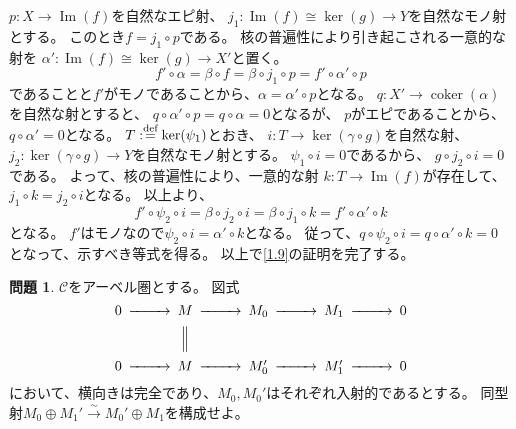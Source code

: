 \documentclass[uplatex,dvipdfmx]{jsarticle}
\makeatletter
\theoremstyle{definition}
\newtheorem{prob}[prob]{問題}
\renewenvironment{proof}[1][\proofname]{
  \pushQED{\qed}%
  \normalfont \topsep6\p@\@plus6\p@\relax
  \trivlist
  \item[\hskip\labelsep
    #1\@addpunct{\textbf{.}}]\ignorespaces
}{%
  \popQED\endtrivlist\@endpefalse
}
\providecommand{\proofname}{証明}
\DeclareMathOperator{\im}{\mathrm{Im}}
\DeclareMathOperator{\coker}{\mathrm{coker}}
\newcommand\mcC{\mathcal{C}}
\def\dfn{:\overset{\mbox{{\scriptsize def}}}{=}}
\makeatother
\begin{document}
\begin{proof}
  \(p:X\to \im(f)\)を自然なエピ射、
  \(j_1:\im(f)\cong \ker(g)\to Y\)を自然なモノ射とする。
  このとき\(f = j_1\circ p\)である。
  核の普遍性により引き起こされる一意的な射を
  \(\alpha' : \im(f)\cong \ker(g)\to X'\)と置く。
  \[
  f'\circ \alpha
  = \beta \circ f
  = \beta \circ j_1 \circ p
  = f'\circ \alpha' \circ p
  \]
  であることと\(f'\)がモノであることから、\(\alpha = \alpha'\circ p\)となる。
  \(q:X'\to \coker(\alpha)\)を自然な射とすると、
  \(q\circ \alpha' \circ p = q\circ \alpha = 0\)となるが、
  \(p\)がエピであることから、\(q\circ \alpha' = 0\)となる。
  \(T\dfn \ker(\psi_1)\)とおき、
  \(i:T\to \ker(\gamma\circ g)\)を自然な射、
  \(j_2:\ker(\gamma\circ g) \to Y\)を自然なモノ射とする。
  \(\psi_1\circ i = 0\)であるから、
  \(g\circ j_2\circ i = 0\)である。
  よって、核の普遍性により、一意的な射
  \(k:T\to \im(f)\)が存在して、
  \(j_1\circ k = j_2\circ i\)となる。
  以上より、
  \[
  f' \circ \psi_2 \circ i
  = \beta\circ j_2\circ i
  = \beta\circ j_1\circ k
  = f'\circ \alpha' \circ k
  \]
  となる。
  \(f'\)はモノなので\(\psi_2\circ i = \alpha'\circ k\)となる。
  従って、\(q\circ \psi_2\circ i = q\circ \alpha' \circ k = 0\)
  となって、示すべき等式を得る。
  以上で\autoref{1.9}の証明を完了する。
\end{proof}







\begin{prob}\label{1.10}
  \(\mcC\)をアーベル圏とする。
  図式
  \[
  \begin{CD}
    0 @>>> M @>>> M_0 @>>> M_1 @>>> 0 \\
    @. @| @. @. @. \\
    0 @>>> M @>>> M_0' @>>> M_1' @>>> 0
  \end{CD}
  \]
  において、横向きは完全であり、\(M_0,M_0'\)はそれぞれ入射的であるとする。
  同型射\(M_0\oplus M_1' \xrightarrow{\sim} M_0'\oplus M_1\)を構成せよ。
\end{prob}
\end{document}
